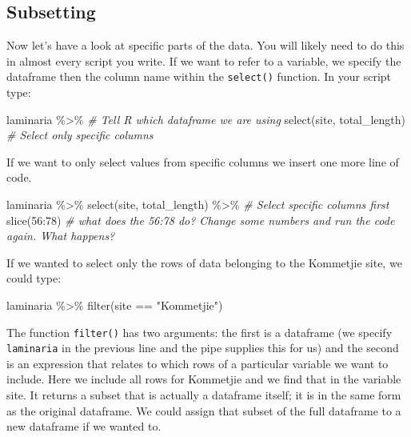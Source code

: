 \documentclass[
]{book}
\newenvironment{Shaded}{\begin{snugshade}}{\end{snugshade}}
\newcommand{\CommentTok}[1]{\textcolor[rgb]{0.56,0.35,0.01}{\textit{#1}}}
\newcommand{\DecValTok}[1]{\textcolor[rgb]{0.00,0.00,0.81}{#1}}
\newcommand{\FunctionTok}[1]{\textcolor[rgb]{0.00,0.00,0.00}{#1}}
\newcommand{\NormalTok}[1]{#1}
\newcommand{\SpecialCharTok}[1]{\textcolor[rgb]{0.00,0.00,0.00}{#1}}
\newcommand{\StringTok}[1]{\textcolor[rgb]{0.31,0.60,0.02}{#1}}
\begin{document}
\hypertarget{subsetting}{%
\subsection{Subsetting}\label{subsetting}}

Now let's have a look at specific parts of the data. You will likely need to do this in almost every script you write. If we want to refer to a variable, we specify the dataframe then the column name within the \texttt{select()} function. In your script type:

\begin{Shaded}
\begin{Highlighting}[]
\NormalTok{laminaria }\SpecialCharTok{\%\textgreater{}\%} \CommentTok{\# Tell R which dataframe we are using}
  \FunctionTok{select}\NormalTok{(site, total\_length) }\CommentTok{\# Select only specific columns}
\end{Highlighting}
\end{Shaded}

If we want to only select values from specific columns we insert one more line of code.

\begin{Shaded}
\begin{Highlighting}[]
\NormalTok{laminaria }\SpecialCharTok{\%\textgreater{}\%} 
  \FunctionTok{select}\NormalTok{(site, total\_length) }\SpecialCharTok{\%\textgreater{}\%} \CommentTok{\# Select specific columns first}
  \FunctionTok{slice}\NormalTok{(}\DecValTok{56}\SpecialCharTok{:}\DecValTok{78}\NormalTok{)}
\CommentTok{\# what does the \textquotesingle{}56:78\textquotesingle{} do? Change some numbers and run the code again. What happens?}
\end{Highlighting}
\end{Shaded}

If we wanted to select only the rows of data belonging to the Kommetjie site, we could type:

\begin{Shaded}
\begin{Highlighting}[]
\NormalTok{laminaria }\SpecialCharTok{\%\textgreater{}\%}
  \FunctionTok{filter}\NormalTok{(site }\SpecialCharTok{==} \StringTok{"Kommetjie"}\NormalTok{)}
\end{Highlighting}
\end{Shaded}

The function \texttt{filter()} has two arguments: the first is a dataframe (we specify \texttt{laminaria} in the previous line and the pipe supplies this for us) and the second is an expression that relates to which rows of a particular variable we want to include. Here we include all rows for Kommetjie and we find that in the variable site. It returns a subset that is actually a dataframe itself; it is in the same form as the original dataframe. We could assign that subset of the full dataframe to a new dataframe if we wanted to.
\end{document}
